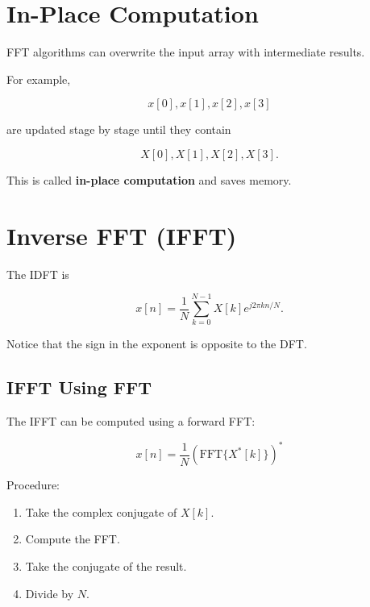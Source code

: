 
\section{In-Place Computation}

FFT algorithms can overwrite the input array with intermediate results.

For example,

\[
x[0],x[1],x[2],x[3]
\]

are updated stage by stage until they contain

\[
X[0],X[1],X[2],X[3].
\]

This is called \textbf{in-place computation} and saves memory.


\section{Inverse FFT (IFFT)}

The IDFT is

\[
x[n]=
\frac{1}{N}
\sum_{k=0}^{N-1}X[k]e^{j2\pi kn/N}.
\]

Notice that the sign in the exponent is opposite to the DFT.


\subsection{IFFT Using FFT}

The IFFT can be computed using a forward FFT:

\[
\boxed{
x[n]=
\frac{1}{N}
\left(
\text{FFT}\{X^*[k]\}
\right)^*
}
\]

Procedure:

\begin{enumerate}
\item Take the complex conjugate of \(X[k]\).
\item Compute the FFT.
\item Take the conjugate of the result.
\item Divide by \(N\).
\end{enumerate}



